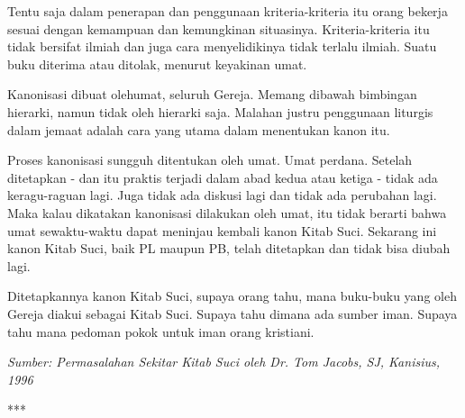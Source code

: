 Tentu  saja dalam penerapan dan penggunaan kriteria-kriteria
itu orang bekerja sesuai dengan  kemampuan  dan  kemungkinan
situasinya. Kriteria-kriteria itu tidak bersifat ilmiah
dan juga cara menyelidikinya  tidak  terlalu  ilmiah.  Suatu
buku diterima atau ditolak, menurut keyakinan umat.


Kanonisasi dibuat olehumat,  seluruh  Gereja.  Memang  dibawah   bimbingan
hierarki,  namun  tidak  oleh  hierarki saja. Malahan justru
penggunaan liturgis dalam  jemaat  adalah  cara  yang  utama
dalam menentukan kanon itu.

Proses kanonisasi sungguh
ditentukan oleh umat. Umat perdana. Setelah ditetapkan - dan
itu praktis terjadi dalam abad kedua atau ketiga - tidak ada
keragu-raguan lagi. Juga tidak ada diskusi  lagi  dan  tidak
ada   perubahan   lagi.   Maka  kalau  dikatakan  kanonisasi
dilakukan  oleh  umat,  itu   tidak   berarti   bahwa   umat
sewaktu-waktu  dapat  meninjau  kembali  kanon  Kitab  Suci.
Sekarang ini kanon Kitab Suci,  baik  PL  maupun  PB,  telah
ditetapkan dan tidak bisa diubah lagi.


Ditetapkannya kanon Kitab Suci,
supaya orang tahu, mana buku-buku yang  oleh  Gereja  diakui
sebagai  Kitab  Suci.  Supaya  tahu  dimana ada sumber iman.
Supaya tahu mana pedoman pokok untuk iman orang kristiani.
 
{\noindent \emph{Sumber: Permasalahan Sekitar Kitab Suci oleh Dr. Tom Jacobs, SJ, Kanisius, 1996}}

\begin{center} ***\end{center}